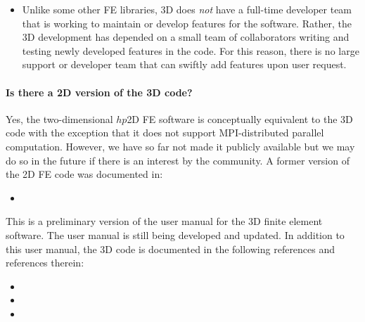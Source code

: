 \begin{itemize}
\item Unlike some other FE libraries, \hp3D does \emph{not} have a full-time developer team that is working to maintain or develop features for the software. Rather, the \hp3D development has depended on a small team of collaborators writing and testing newly developed features in the code. For this reason, there is no large support or developer team that can swiftly add features upon user request.

\end{itemize}

\paragraph{Is there a 2D version of the \hp3D code?} Yes, the two-dimensional $hp$2D FE software is conceptually equivalent to the 3D code with the exception that it does not support MPI-distributed parallel computation. However, we have so far not made it publicly available but we may do so in the future if there is an interest by the community. A former version of the 2D FE code was documented in:
\begin{itemize}
	\item {}
\end{itemize}

\begin{remark}
This is a preliminary version of the user manual for the \hp3D finite element software. The user manual is still being developed and updated. In addition to this user manual, the \hp3D code is documented in the following references and references therein:

\begin{itemize}
	\item {}
	\item {}
	\item {}
\end{itemize}

\end{remark}

%


